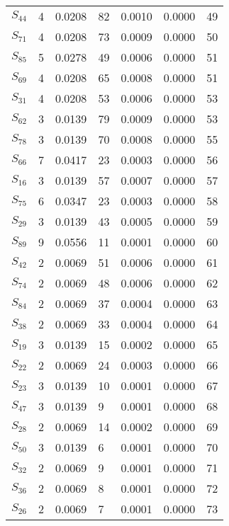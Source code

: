 \begin{xltabular}{\textwidth}{XPPPPPP}
  $S_{44}$ & 4 & 0.0208 & 82 & 0.0010 & 0.0000 & 49 \\ 
  $S_{71}$ & 4 & 0.0208 & 73 & 0.0009 & 0.0000 & 50 \\ 
  $S_{85}$ & 5 & 0.0278 & 49 & 0.0006 & 0.0000 & 51 \\ 
  $S_{69}$ & 4 & 0.0208 & 65 & 0.0008 & 0.0000 & 51 \\ 
  $S_{31}$ & 4 & 0.0208 & 53 & 0.0006 & 0.0000 & 53 \\ 
  $S_{62}$ & 3 & 0.0139 & 79 & 0.0009 & 0.0000 & 53 \\ 
  $S_{78}$ & 3 & 0.0139 & 70 & 0.0008 & 0.0000 & 55 \\ 
  $S_{66}$ & 7 & 0.0417 & 23 & 0.0003 & 0.0000 & 56 \\ 
  $S_{16}$ & 3 & 0.0139 & 57 & 0.0007 & 0.0000 & 57 \\ 
  $S_{75}$ & 6 & 0.0347 & 23 & 0.0003 & 0.0000 & 58 \\ 
  $S_{29}$ & 3 & 0.0139 & 43 & 0.0005 & 0.0000 & 59 \\ 
  $S_{89}$ & 9 & 0.0556 & 11 & 0.0001 & 0.0000 & 60 \\ 
  $S_{42}$ & 2 & 0.0069 & 51 & 0.0006 & 0.0000 & 61 \\ 
  $S_{74}$ & 2 & 0.0069 & 48 & 0.0006 & 0.0000 & 62 \\ 
  $S_{84}$ & 2 & 0.0069 & 37 & 0.0004 & 0.0000 & 63 \\ 
  $S_{38}$ & 2 & 0.0069 & 33 & 0.0004 & 0.0000 & 64 \\ 
  $S_{19}$ & 3 & 0.0139 & 15 & 0.0002 & 0.0000 & 65 \\ 
  $S_{22}$ & 2 & 0.0069 & 24 & 0.0003 & 0.0000 & 66 \\ 
  $S_{23}$ & 3 & 0.0139 & 10 & 0.0001 & 0.0000 & 67 \\ 
  $S_{47}$ & 3 & 0.0139 & 9 & 0.0001 & 0.0000 & 68 \\ 
  $S_{28}$ & 2 & 0.0069 & 14 & 0.0002 & 0.0000 & 69 \\ 
  $S_{50}$ & 3 & 0.0139 & 6 & 0.0001 & 0.0000 & 70 \\ 
  $S_{32}$ & 2 & 0.0069 & 9 & 0.0001 & 0.0000 & 71 \\ 
  $S_{36}$ & 2 & 0.0069 & 8 & 0.0001 & 0.0000 & 72 \\ 
  $S_{26}$ & 2 & 0.0069 & 7 & 0.0001 & 0.0000 & 73 \\ 

\end{xltabular}
